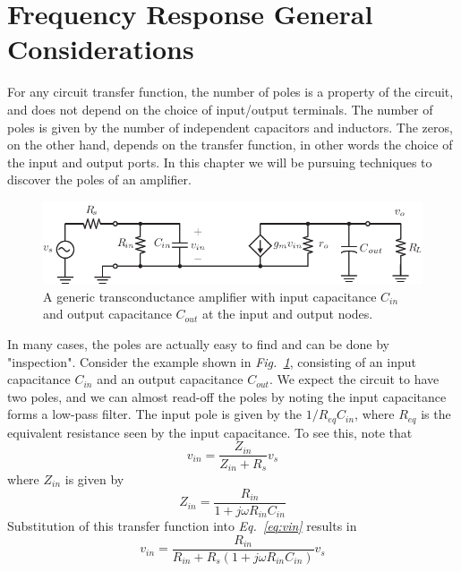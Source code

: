 \section{Frequency Response General Considerations}
For any circuit transfer function, the number of poles is a property of the circuit, and does not depend on the choice of input/output terminals.  The number of poles is given by the number of independent capacitors and inductors.  The zeros, on the other hand, depends on the transfer function, in other words the choice of the input and output ports.  In this chapter we will be pursuing techniques to discover the poles of an amplifier.  
\begin{figure}[tb]
\centering
\includegraphics[scale=1]{amp_two_poles}
\caption{A generic transconductance amplifier with input capacitance $C_{in}$ and output capacitance $C_{out}$ at the input and output nodes.}
\label{fig:amp_two_poles_indep}
\end{figure}
In many cases, the poles are actually easy to find and can be done by "inspection".  Consider the example shown in \emph{Fig.~\ref{fig:amp_two_poles_indep}}, consisting of an input capacitance $C_{in}$ and an output capacitance $C_{out}$.  We expect the circuit to have two poles, and we can almost read-off the poles by noting the input capacitance forms a low-pass filter.  The input pole is given by the $1/R_{eq}C_{in}$, where $R_{eq}$ is the equivalent resistance seen by the input capacitance.  To see this, note that
    \begin{equation}
        v_{in} = \frac{Z_{in}}{Z_{in} + R_s} v_s \label{eq:vin}
    \end{equation} 
where $Z_{in}$ is given by
    \begin{equation}
        Z_{in} = \frac{R_{in}}{1 + j\omega R_{in} C_{in}}
    \end{equation}
Substitution of this transfer function into \emph{Eq.~\ref{eq:vin}} results in
    \begin{equation}
        v_{in} = \frac{R_{in}}{R_{in} + R_s(1 + j\omega R_{in} C_{in})} v_s 
    \end{equation}
